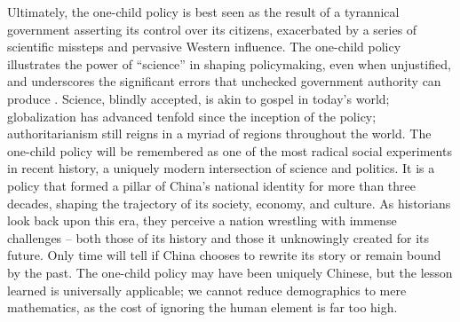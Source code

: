 Ultimately, the one-child policy is best seen as the result of a tyrannical government asserting its control over its citizens, exacerbated by a series of scientific missteps and pervasive Western influence. The one-child policy illustrates the power of “science” in shaping policymaking, even when unjustified, and underscores the significant errors that unchecked government authority can produce \autocite[p.\ 343]{Greenhalgh2008JustOneChild}. Science, blindly accepted, is akin to gospel in today’s world; globalization has advanced tenfold since the inception of the policy; authoritarianism still reigns in a myriad of regions throughout the world. The one-child policy will be remembered as one of the most radical social experiments in recent history, a uniquely modern intersection of science and politics. It is a policy that formed a pillar of China’s national identity for more than three decades, shaping the trajectory of its society, economy, and culture. As historians look back upon this era, they perceive a nation wrestling with immense challenges – both those of its history and those it unknowingly created for its future. Only time will tell if China chooses to rewrite its story or remain bound by the past. The one-child policy may have been uniquely Chinese, but the lesson learned is universally applicable; we cannot reduce demographics to mere mathematics, as the cost of ignoring the human element is far too high.


